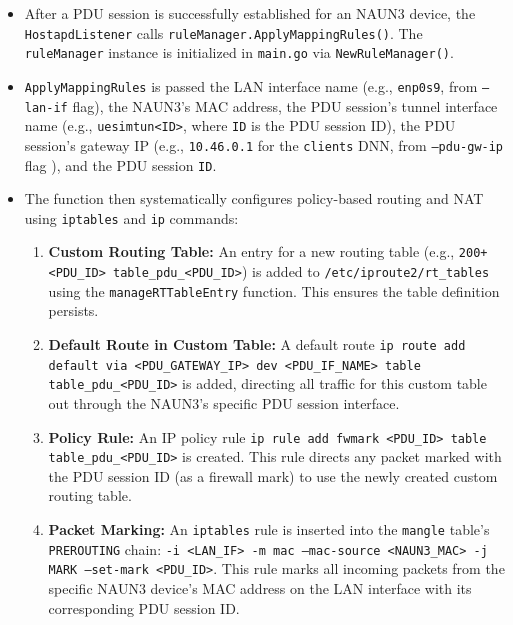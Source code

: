 \begin{itemize}
    \item After a \ac{PDU} session is successfully established for an \ac{NAUN3} device, the \texttt{HostapdListener} calls \texttt{ruleManager.ApplyMappingRules()}. The \texttt{ruleManager} instance is initialized in \texttt{main.go} via \texttt{NewRuleManager()}.

    \item \texttt{ApplyMappingRules} is passed the \ac{LAN} interface name (e.g., \texttt{enp0s9}, from \texttt{--lan-if} flag), the \ac{NAUN3}'s \ac{MAC} address, the \ac{PDU} session's tunnel interface name (e.g., \texttt{uesimtun<ID>}, where \texttt{ID} is the \ac{PDU} session ID), the \ac{PDU} session's gateway \ac{IP} (e.g., \texttt{10.46.0.1} for the \texttt{clients} \ac{DNN}, from \texttt{--pdu-gw-ip} flag ), and the \ac{PDU} session \texttt{ID}.
    
    \item{ 
        The function then systematically configures policy-based routing and \ac{NAT} using \texttt{iptables} and \texttt{ip} commands:
        
        \begin{enumerate}
            \item \textbf{Custom Routing Table:} An entry for a new routing table (e.g., \texttt{200+<PDU\_ID> table\_pdu\_<PDU\_ID>}) is added to \texttt{/etc/iproute2/rt\_tables} using the \texttt{manageRTTableEntry} function. This ensures the table definition persists.
            
            \item \textbf{Default Route in Custom Table:} A default route \texttt{ip route add default via <PDU\_GATEWAY\_IP> dev <PDU\_IF\_NAME> table table\_pdu\_<PDU\_ID>} is added, directing all traffic for this custom table out through the \ac{NAUN3}'s specific \ac{PDU} session interface.
            
            \item \textbf{Policy Rule:} An \ac{IP} policy rule \texttt{ip rule add fwmark <PDU\_ID> table table\_pdu\_<PDU\_ID>} is created. This rule directs any packet marked with the \ac{PDU} session ID (as a firewall mark) to use the newly created custom routing table.
            
            \item \textbf{Packet Marking:} An \texttt{iptables} rule is inserted into the \texttt{mangle} table's \texttt{PREROUTING} chain: \texttt{-i <LAN\_IF> -m mac --mac-source <NAUN3\_MAC> -j MARK --set-mark <PDU\_ID>}. This rule marks all incoming packets from the specific \ac{NAUN3} device's \ac{MAC} address on the \ac{LAN} interface with its corresponding \ac{PDU} session ID.
            

\end{enumerate}}
\end{itemize}
